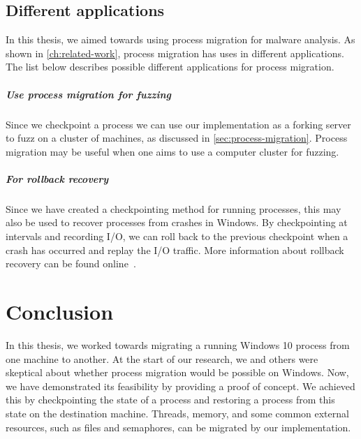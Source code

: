 \documentclass[a4paper, 11pt, english]{report}
\begin{document}

\section{Different applications}
In this thesis, we aimed towards using process migration for malware analysis. As shown in \autoref{ch:related-work}, process migration has uses in different applications. The list below describes possible different applications for process migration.

\paragraph{Use process migration for fuzzing}
Since we checkpoint a process we can use our implementation as a forking server to fuzz on a cluster of machines, as discussed in \autoref{sec:process-migration}. Process migration may be useful when one aims to use a computer cluster for fuzzing.

\paragraph{For rollback recovery}
Since we have created a checkpointing method for running processes, this may also be used to recover processes from crashes in Windows. By checkpointing at intervals and recording I/O, we can roll back to the previous checkpoint when a crash has occurred and replay the I/O traffic. More information about rollback recovery can be found online~\cite{chung1999winckp}.


\chapter{Conclusion}
\label{ch:conclusion}


In this thesis, we worked towards migrating a running Windows 10 process from one machine to another.
At the start of our research, we and others were skeptical about whether process migration would be possible on Windows. Now, we have demonstrated its feasibility by providing a proof of concept. We achieved this by checkpointing the state of a process and restoring a process from this state on the destination machine. Threads, memory, and some common external resources, such as files and semaphores, can be migrated by our implementation.
\end{document}
